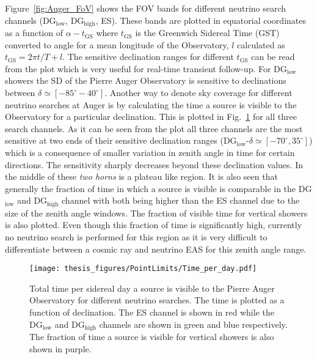 Figure~\ref{fig:Auger_FoV} shows the FOV bands for different neutrino search channels (DG$\mathrm{_{\text{low}}}$, DG$\mathrm{_{\text{high}}}$, ES). These bands are plotted in equatorial coordinates as a function of $\alpha - t _{\text{GS}}$ where $t_{\text{GS}}$ is the Greenwich Sidereal Time (GST) converted to angle for a mean longitude of the Observatory, $l$ calculated as $t_{\text{GS}}= 2\pi t/T + l$. The sensitive declination ranges for different $t_{\text{GS}}$ can be read from the plot which is very useful for real-time transient follow-up. For DG$\mathrm{_{\text{low}}}$ showers the SD of the Pierre Auger Observatory is sensitive to declinations between $\delta \simeq [-85^{\circ} - 40^{\circ}]$. Another way to denote sky coverage for different neutrino searches at Auger is by calculating the time a source is visible to the Observatory for a particular declination. This is plotted in Fig.~\ref{fig:time_per_day} for all three search channels. As it can be seen from the plot all three channels are the most sensitive at two ends of their sensitive declination ranges (DG$\mathrm{_{\text{low}}}$-$\delta \simeq [-70^{\circ}, 35^{\circ}]$) which is a consequence of smaller variation in zenith angle in time for certain directions. The sensitivity sharply decreases beyond these declination values. In the middle of these \textit{two horns} is a plateau like region. It is also seen that generally the fraction of time in which a source is visible is comparable in the DG$\mathrm{_{\text{low}}}$ and DG$\mathrm{_{\text{high}}}$ channel with both being higher than the ES channel due to the size of the zenith angle windows. The fraction of visible time for vertical showers is also plotted. Even though this fraction of time is significantly high, currently no neutrino search is performed for this region as it is very difficult to differentiate between a cosmic ray and neutrino EAS for this zenith angle range.


\begin{figure}[t!]
  \centering
  \texttt{[image: thesis\_figures/PointLimits/Time\_per\_day.pdf]}
  \caption{Total time per sidereal day a source is visible to the Pierre Auger Observatory for different neutrino searches. The time is plotted as a function of declination. The ES channel is shown in red while the DG$\mathrm{_{\text{low}}}$ and DG$\mathrm{_{\text{high}}}$ channels are shown in green and blue respectively. The fraction of time a source is visible for vertical showers is also shown in purple.}
  \label{fig:time_per_day}
\end{figure}

